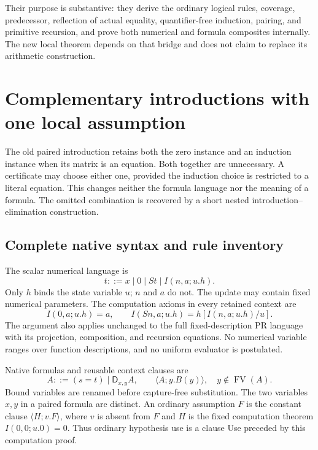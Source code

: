 \documentclass[11pt,a4paper]{article}
\theoremstyle{definition}\newtheorem{definition}[theorem]{Definition}
\theoremstyle{remark}\newtheorem{remark}[theorem]{Remark}
\begin{document}
Their purpose is substantive: they derive the ordinary logical rules,
coverage, predecessor, reflection of actual equality, quantifier-free
induction, pairing, and primitive recursion, and prove both numerical
and formula composites internally. The new local theorem depends on
that bridge and does not claim to replace its arithmetic construction.



\section{Complementary introductions with one local assumption}
\label{sec:choice-introduction}

The old paired introduction retains both the zero instance and an
induction instance when its matrix is an equation. Both together are
unnecessary. A certificate may choose either one, provided the induction
choice is restricted to a literal equation. This changes neither the
formula language nor the meaning of a formula. The omitted combination
is recovered by a short nested introduction--elimination construction.

\subsection{Complete native syntax and rule inventory}

The scalar numerical language is
\[
 t::=x\mid0\mid St\mid I(n,a;u.h).
\]
Only $h$ binds the state variable $u$; $n$ and $a$ do not.
The update may contain fixed numerical parameters. The computation
axioms in every retained context are
\[
 I(0,a;u.h)=a,\qquad
 I(Sn,a;u.h)=h[I(n,a;u.h)/u].
 \tag{I0, IS}\label{eq:choice-computations}
\]
The argument also applies unchanged to the full fixed-description PR
language with its projection, composition, and recursion equations.
No numerical variable ranges over function descriptions, and no uniform
evaluator is postulated.

Native formulas and reusable context clauses are
\[
 A::=(s=t)\mid\mathsf D_{x,y}A,\qquad
 \langle A;y.B(y)\rangle,\quad y\notin\operatorname{FV}(A).
\]
Bound variables are renamed before capture-free substitution.
The two variables $x,y$ in a paired formula are distinct.
An ordinary assumption $F$ is the constant clause
$\langle H;v.F\rangle$, where $v$ is absent from $F$ and $H$ is the
fixed computation theorem $I(0,0;u.0)=0$. Thus ordinary hypothesis
use is a clause Use preceded by this computation proof.
\end{document}
